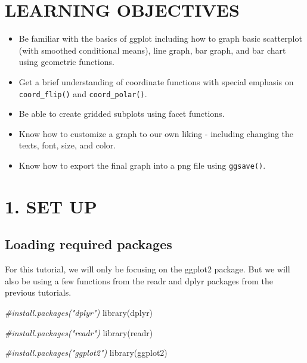 \documentclass[
]{book}
\newenvironment{Shaded}{\begin{snugshade}}{\end{snugshade}}
\newcommand{\CommentTok}[1]{\textcolor[rgb]{0.56,0.35,0.01}{\textit{#1}}}
\newcommand{\FunctionTok}[1]{\textcolor[rgb]{0.00,0.00,0.00}{#1}}
\newcommand{\NormalTok}[1]{#1}
\providecommand{\tightlist}{%
  \setlength{\itemsep}{0pt}\setlength{\parskip}{0pt}}
\begin{document}
\hypertarget{learning-objectives-5}{%
\section{LEARNING OBJECTIVES}\label{learning-objectives-5}}

\begin{itemize}
\tightlist
\item
  Be familiar with the basics of ggplot including how to graph basic scatterplot (with smoothed conditional means), line graph, bar graph, and bar chart using geometric functions.
\item
  Get a brief understanding of coordinate functions with special emphasis on \texttt{coord\_flip()} and \texttt{coord\_polar()}.
\item
  Be able to create gridded subplots using facet functions.
\item
  Know how to customize a graph to our own liking - including changing the texts, font, size, and color.
\item
  Know how to export the final graph into a png file using \texttt{ggsave()}.
\end{itemize}

\hypertarget{set-up-2}{%
\section{1. SET UP}\label{set-up-2}}

\hypertarget{loading-required-packages}{%
\subsection{Loading required packages}\label{loading-required-packages}}

For this tutorial, we will only be focusing on the ggplot2 package. But we will also be using a few functions from the readr and dplyr packages from the previous tutorials.

\begin{Shaded}
\begin{Highlighting}[]
\CommentTok{\#install.packages("dplyr")}
\FunctionTok{library}\NormalTok{(dplyr)}

\CommentTok{\#install.packages("readr")}
\FunctionTok{library}\NormalTok{(readr)}

\CommentTok{\#install.packages("ggplot2")}
\FunctionTok{library}\NormalTok{(ggplot2)}
\end{Highlighting}
\end{Shaded}
\end{document}

